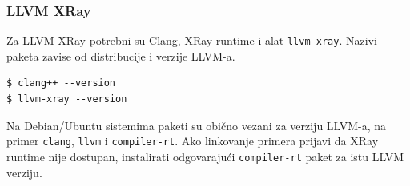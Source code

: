 \subsubsection{LLVM XRay}\label{instalacija-llvm-xray}

Za LLVM XRay potrebni su Clang, XRay runtime i alat \texttt{llvm-xray}. Nazivi paketa zavise od distribucije i verzije LLVM-a.

\begin{verbatim}
$ clang++ --version
$ llvm-xray --version
\end{verbatim}

Na Debian/Ubuntu sistemima paketi su obično vezani za verziju LLVM-a, na primer \texttt{clang}, \texttt{llvm} i \texttt{compiler-rt}. Ako linkovanje primera prijavi da XRay runtime nije dostupan, instalirati odgovarajući \texttt{compiler-rt} paket za istu LLVM verziju.
